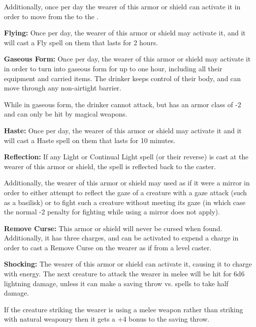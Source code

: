 \begin{multicols*}{2}
Additionally, once per day the wearer of this armor or shield can activate it in order to move from the  to the .

\textbf{Flying:} Once per day, the wearer of this armor or shield may activate it, and it will cast a Fly spell on them that lasts for 2 hours.

\textbf{Gaseous Form:} Once per day, the wearer of this armor or shield may activate it in order to turn into gaseous form for up to one hour, including all their equipment and carried items. The drinker keeps control of their body, and can move through any non-airtight barrier.

While in gaseous form, the drinker cannot attack, but has an armor class of -2 and can only be hit by magical weapons.

\textbf{Haste:} Once per day, the wearer of this armor or shield may activate it and it will cast a Haste spell on them that lasts for 10 minutes.

\textbf{Reflection:} If any Light or Continual Light spell (or their reverse) is cast at the wearer of this armor or shield, the spell is reflected back to the caster.

Additionally, the wearer of this armor or shield may used as if it were a mirror in order to either attempt to reflect the gaze of a creature with a gaze attack (such as a basilisk) or to fight such a creature without meeting its gaze (in which case the normal -2 penalty for fighting while using a mirror does not apply).

\textbf{Remove Curse:} This armor or shield will never be cursed when found. Additionally, it has three charges, and can be activated to expend a charge in order to cast a Remove Curse on the wearer as if from a  level caster.

\textbf{Shocking:} The wearer of this armor or shield can activate it, causing it to charge with energy. The next creature to attack the wearer in melee will be hit for 6d6 lightning damage, unless it can make a saving throw vs. spells to take half damage.

If the creature striking the wearer is using a melee weapon rather than striking with natural weaponry then it gets a +4 bonus to the saving throw.


\end{multicols*}
